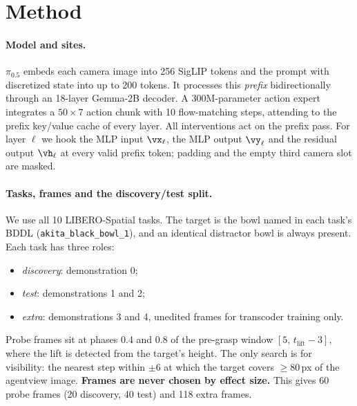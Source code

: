 \documentclass{article} %
\newcommand{\pifive}{$\pi_{0.5}$}
\begin{document}
\section{Method}
\label{sec:method}

\paragraph{Model and sites.} \pifive{} embeds each camera image into 256 SigLIP tokens and the prompt with discretized state into up to 200 tokens. It processes this \emph{prefix} bidirectionally through an 18-layer Gemma-2B decoder. A 300M-parameter action expert integrates a $50{\times}7$ action chunk with 10 flow-matching steps, attending to the prefix key/value cache of every layer. All interventions act on the prefix pass. For layer $\ell$ we hook the MLP input $\vx_\ell$, the MLP output $\vy_\ell$ and the residual output $\vh_\ell$ at every valid prefix token; padding and the empty third camera slot are masked.

\paragraph{Tasks, frames and the discovery/test split.} We use all 10 LIBERO-Spatial tasks. The target is the bowl named in each task's BDDL (\texttt{akita\_black\_bowl\_1}), and an identical distractor bowl is always present. Each task has three roles:
\begin{itemize}[leftmargin=*,itemsep=0pt,topsep=1pt]
  \item \emph{discovery}: demonstration 0;
  \item \emph{test}: demonstrations 1 and 2;
  \item \emph{extra}: demonstrations 3 and 4, unedited frames for transcoder training only.
\end{itemize}
Probe frames sit at phases 0.4 and 0.8 of the pre-grasp window $[5,\,t_{\text{lift}}{-}3]$, where the lift is detected from the target's height. The only search is for visibility: the nearest step within $\pm6$ at which the target covers $\ge$80\,px of the agentview image. \textbf{Frames are never chosen by effect size.} This gives 60 probe frames (20 discovery, 40 test) and 118 extra frames.
\end{document}
